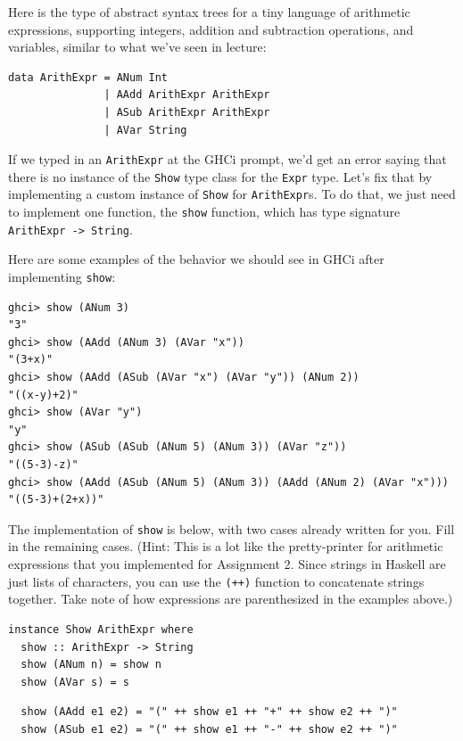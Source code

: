 \documentclass[addpoints]{exam}
\begin{document}
\begin{questions}
\newpage

\question[6] Here is the type of abstract syntax trees for a tiny language of arithmetic expressions, supporting integers, addition and subtraction operations, and variables, similar to what we've seen in lecture:

\begin{verbatim}
data ArithExpr = ANum Int 
               | AAdd ArithExpr ArithExpr
               | ASub ArithExpr ArithExpr
               | AVar String
\end{verbatim}

If we typed in an \verb|ArithExpr| at the GHCi prompt, we'd get an error saying that there is no instance of the \verb|Show| type class for the \verb|Expr| type.  Let's fix that by implementing a custom instance of \verb|Show| for \verb|ArithExpr|s.  To do that, we just need to implement one function, the \verb|show| function, which has type signature \verb|ArithExpr -> String|.

Here are some examples of the behavior we should see in GHCi after implementing \verb|show|:

\begin{verbatim}
ghci> show (ANum 3)
"3"
ghci> show (AAdd (ANum 3) (AVar "x"))
"(3+x)"
ghci> show (AAdd (ASub (AVar "x") (AVar "y")) (ANum 2))
"((x-y)+2)"
ghci> show (AVar "y")
"y"
ghci> show (ASub (ASub (ANum 5) (ANum 3)) (AVar "z"))
"((5-3)-z)"
ghci> show (AAdd (ASub (ANum 5) (ANum 3)) (AAdd (ANum 2) (AVar "x")))
"((5-3)+(2+x))"
\end{verbatim}

The implementation of \verb|show| is below, with two cases already written for you.  Fill in the remaining cases.  (Hint: This is a lot like the pretty-printer for arithmetic expressions that you implemented for Assignment 2.  Since strings in Haskell are just lists of characters, you can use the \verb|(++)| function to concatenate strings together.  Take note of how expressions are parenthesized in the examples above.)

\begin{verbatim}
instance Show ArithExpr where
  show :: ArithExpr -> String
  show (ANum n) = show n
  show (AVar s) = s
\end{verbatim}
\begin{solutionorbox}[2in]
\begin{verbatim}
  show (AAdd e1 e2) = "(" ++ show e1 ++ "+" ++ show e2 ++ ")"
  show (ASub e1 e2) = "(" ++ show e1 ++ "-" ++ show e2 ++ ")"
\end{verbatim}
\end{solutionorbox}


\end{questions}
\end{document}
